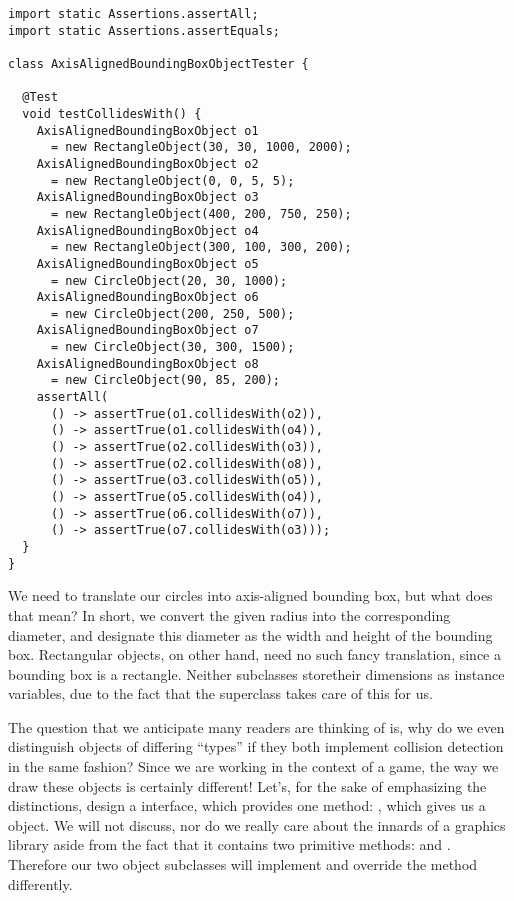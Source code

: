 \begin{lstlisting}[language=MyJava]
import static Assertions.assertAll;
import static Assertions.assertEquals;

class AxisAlignedBoundingBoxObjectTester {

  @Test
  void testCollidesWith() {
    AxisAlignedBoundingBoxObject o1 
      = new RectangleObject(30, 30, 1000, 2000);
    AxisAlignedBoundingBoxObject o2 
      = new RectangleObject(0, 0, 5, 5);
    AxisAlignedBoundingBoxObject o3 
      = new RectangleObject(400, 200, 750, 250);
    AxisAlignedBoundingBoxObject o4 
      = new RectangleObject(300, 100, 300, 200);
    AxisAlignedBoundingBoxObject o5 
      = new CircleObject(20, 30, 1000);
    AxisAlignedBoundingBoxObject o6 
      = new CircleObject(200, 250, 500);
    AxisAlignedBoundingBoxObject o7 
      = new CircleObject(30, 300, 1500);
    AxisAlignedBoundingBoxObject o8 
      = new CircleObject(90, 85, 200);
    assertAll(
      () -> assertTrue(o1.collidesWith(o2)),
      () -> assertTrue(o1.collidesWith(o4)),
      () -> assertTrue(o2.collidesWith(o3)),
      () -> assertTrue(o2.collidesWith(o8)),
      () -> assertTrue(o3.collidesWith(o5)),
      () -> assertTrue(o5.collidesWith(o4)),
      () -> assertTrue(o6.collidesWith(o7)),
      () -> assertTrue(o7.collidesWith(o3)));
  }
}
\end{lstlisting}

We need to translate our circles into axis-aligned bounding box, but what does that mean? In short, we convert the given radius into the corresponding diameter, and designate this diameter as the width and height of the bounding box. Rectangular objects, on other hand, need no such fancy translation, since a bounding box is a rectangle. Neither subclasses storetheir dimensions as instance variables, due to the fact that the superclass takes care of this for us.

The question that we anticipate many readers are thinking of is, why do we even distinguish objects of differing ``types'' if they both implement collision detection in the same fashion? Since we are working in the context of a game, the way we draw these objects is certainly different! Let's, for the sake of emphasizing the distinctions, design a  interface, which provides one method: , which gives us a  object. We will not discuss, nor do we really care about the innards of a graphics library aside from the fact that it contains two primitive methods:  and . Therefore our two object subclasses will implement  and override the method differently.


